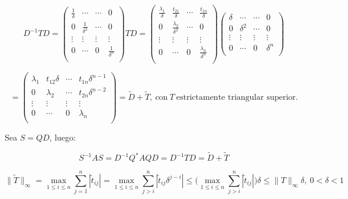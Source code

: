 $$D^{-1}TD = 
	\begin{pmatrix}
        \frac{1}{\delta} & \cdots & \cdots & 0\\
        0 & \frac{1}{\delta^{2}} & \cdots & 0\\
        \vdots & \vdots & \vdots & \vdots\\
        0 & \cdots & 0 & \frac{1}{\delta^{n}}\\
	\end{pmatrix}
	TD
	=
	\begin{pmatrix}
        \frac{\lambda_{1}}{\delta} & \frac{t_{21}}{\delta} & \cdots & \frac{t_{1n}}{\delta}\\
        0 & \frac{\lambda_{2}}{\delta^{2}} & \cdots & 0\\
        \vdots & \vdots & \vdots & \vdots\\
        0 & \cdots & 0 & \frac{\lambda_{n}}{\delta^{n}}\\
	\end{pmatrix}
	\begin{pmatrix}
        \delta & \cdots & \cdots & 0\\
        0 & \delta^{2} & \cdots & 0\\
        \vdots & \vdots & \vdots & \vdots\\
        0 & \cdots & 0 & \delta^{n}\\
	\end{pmatrix}
$$

$$
	=
	\begin{pmatrix}
        \lambda_{1} & t_{12}\delta & \cdots & t_{1n}\delta^{n - 1}\\
        0 & \lambda_{2} & \cdots & t_{2n}\delta^{n - 2}\\
        \vdots & \vdots & \vdots & \vdots\\
        0 & \cdots & 0 & \lambda_{n}\\
	\end{pmatrix}
	= \tilde{D} + \tilde{T}
	,\ \text{con}\ T\ \text{estrictamente triangular superior.}
$$

Sea $S = QD$, luego:

$$S^{-1}AS = D^{-1}Q^{*}AQD = D^{-1}TD = \tilde{D} + \tilde{T}$$

$$\|\tilde{T}\|_{\infty} = \max \limits_{1 \leq i \leq n} \sum \limits_{j = 1}^{n} |\tilde{t}_{ij}| = \max \limits_{1 \leq i \leq n} \sum \limits_{j > i}^{n} |\tilde{t}_{ij}\delta^{j - i}| \leq \bigg( \max \limits_{1 \leq i \leq n} \sum \limits_{j > i}^{n} |\tilde{t}_{ij}| \bigg)\delta \leq \|T\|_{\infty}\delta,\ 0 < \delta < 1$$

